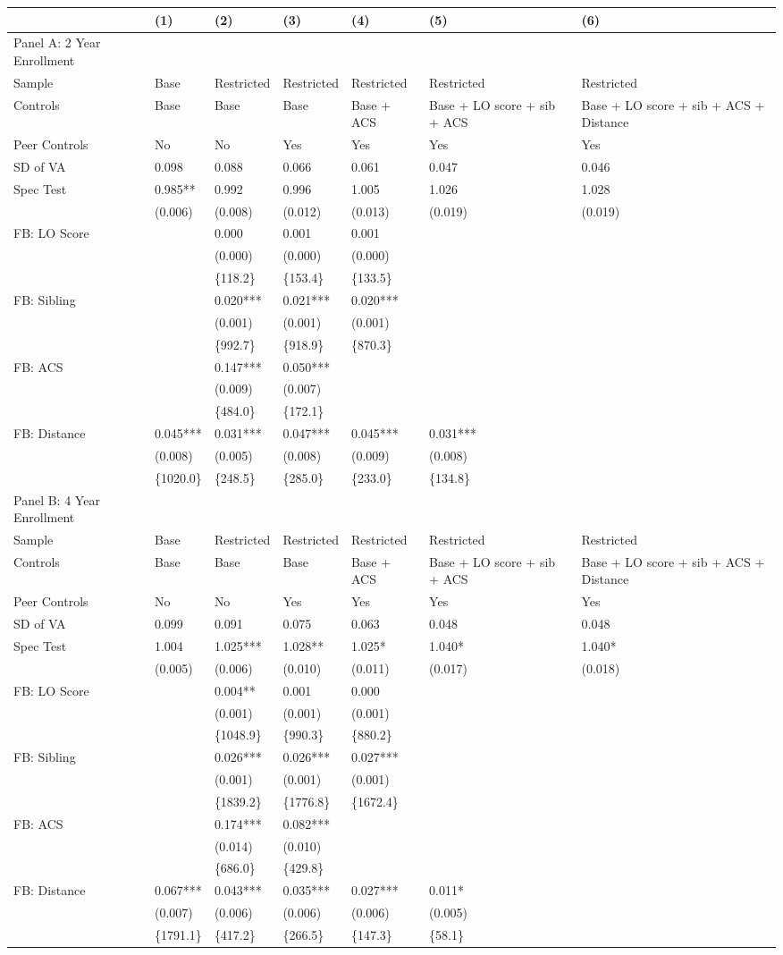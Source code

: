 \documentclass{article}
\begin{document}
\begin{table}[tbp] \centering
{}

{\footnotesize
\begin{tabularx}{\linewidth}{lCCCCCC}

\toprule
&{(1)}&{(2)}&{(3)}&{(4)}&{(5)}&{(6)} \tabularnewline
\midrule \addlinespace[\belowrulesep]
Panel A: 2 Year Enrollment&&&&&& \tabularnewline
\midrule Sample&Base&Restricted&Restricted&Restricted&Restricted&Restricted \tabularnewline
Controls&Base&Base&Base&Base + ACS&Base + LO score + sib + ACS&Base + LO score + sib + ACS + Distance \tabularnewline
Peer Controls&No&No&Yes&Yes&Yes&Yes \tabularnewline
\midrule SD of VA&0.098&0.088&0.066&0.061&0.047&0.046 \tabularnewline
Spec Test&0.985**&0.992&0.996&1.005&1.026&1.028 \tabularnewline
&(0.006)&(0.008)&(0.012)&(0.013)&(0.019)&(0.019) \tabularnewline
FB: LO Score&&0.000&0.001&0.001&& \tabularnewline
&&(0.000)&(0.000)&(0.000)&& \tabularnewline
&&\{118.2\}&\{153.4\}&\{133.5\}&& \tabularnewline
FB: Sibling&&0.020***&0.021***&0.020***&& \tabularnewline
&&(0.001)&(0.001)&(0.001)&& \tabularnewline
&&\{992.7\}&\{918.9\}&\{870.3\}&& \tabularnewline
FB: ACS&&0.147***&0.050***&&& \tabularnewline
&&(0.009)&(0.007)&&& \tabularnewline
&&\{484.0\}&\{172.1\}&&& \tabularnewline
FB: Distance&0.045***&0.031***&0.047***&0.045***&0.031***& \tabularnewline
&(0.008)&(0.005)&(0.008)&(0.009)&(0.008)& \tabularnewline
&\{1020.0\}&\{248.5\}&\{285.0\}&\{233.0\}&\{134.8\}& \tabularnewline
\midrule \midrule Panel B: 4 Year Enrollment&&&&&& \tabularnewline
\midrule Sample&Base&Restricted&Restricted&Restricted&Restricted&Restricted \tabularnewline
Controls&Base&Base&Base&Base + ACS&Base + LO score + sib + ACS&Base + LO score + sib + ACS + Distance \tabularnewline
Peer Controls&No&No&Yes&Yes&Yes&Yes \tabularnewline
\midrule SD of VA&0.099&0.091&0.075&0.063&0.048&0.048 \tabularnewline
Spec Test&1.004&1.025***&1.028**&1.025*&1.040*&1.040* \tabularnewline
&(0.005)&(0.006)&(0.010)&(0.011)&(0.017)&(0.018) \tabularnewline
FB: LO Score&&0.004**&0.001&0.000&& \tabularnewline
&&(0.001)&(0.001)&(0.001)&& \tabularnewline
&&\{1048.9\}&\{990.3\}&\{880.2\}&& \tabularnewline
FB: Sibling&&0.026***&0.026***&0.027***&& \tabularnewline
&&(0.001)&(0.001)&(0.001)&& \tabularnewline
&&\{1839.2\}&\{1776.8\}&\{1672.4\}&& \tabularnewline
FB: ACS&&0.174***&0.082***&&& \tabularnewline
&&(0.014)&(0.010)&&& \tabularnewline
&&\{686.0\}&\{429.8\}&&& \tabularnewline
FB: Distance&0.067***&0.043***&0.035***&0.027***&0.011*& \tabularnewline
&(0.007)&(0.006)&(0.006)&(0.006)&(0.005)& \tabularnewline
&\{1791.1\}&\{417.2\}&\{266.5\}&\{147.3\}&\{58.1\}& \tabularnewline
\bottomrule 

\end{tabularx}
}
\end{table}
\end{document}
